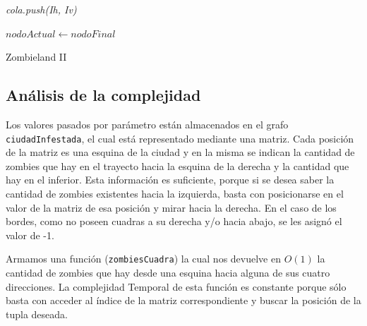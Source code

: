 \IncMargin{1em}
\begin{algorithm}
\BlankLine
\BlankLine
\emph{cola.push(Ih, Iv)}\;

	\emph{$nodoActual \leftarrow nodoFinal$}\;
\;



\caption{Zombieland II}%
\end{algorithm}\DecMargin{1em}

\newpage
\subsection{An\'alisis de la complejidad}

Los valores pasados por par\'ametro est\'an almacenados en el grafo \texttt{ciudadInfestada}, el cual est\'a representado mediante una matriz.
Cada posici\'on de la matriz es una esquina de la ciudad y en la misma se indican la cantidad de zombies que hay en el trayecto hacia la esquina de la derecha y la cantidad que hay en el inferior. 
Esta informaci\'on es suficiente, porque si se desea saber la cantidad de zombies existentes hacia la izquierda, basta con posicionarse en el valor de la matriz de esa posici\'on y mirar hacia la derecha.
En el caso de los bordes, como no poseen cuadras a su derecha y/o hacia abajo, se les asign\'o el valor de -1.

Armamos una funci\'on (\texttt{zombiesCuadra}) la cual nos devuelve en $O(1)$ la cantidad de zombies que hay desde una esquina hacia alguna de sus cuatro direcciones. La complejidad Temporal de esta funci\'on es constante porque s\'olo basta con acceder al \'indice de la matriz correspondiente y buscar la posici\'on de la tupla deseada.\\
\\

